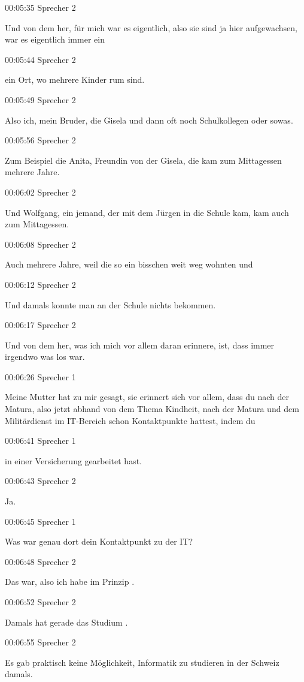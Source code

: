 00:05:35 Sprecher 2

Und von dem her, für mich war es eigentlich, also sie sind ja hier
aufgewachsen, war es eigentlich immer ein

00:05:44 Sprecher 2

ein Ort, wo mehrere Kinder rum sind.

00:05:49 Sprecher 2

Also ich, mein Bruder, die Gisela und dann oft noch Schulkollegen oder
sowas.

00:05:56 Sprecher 2

Zum Beispiel die Anita, Freundin von der Gisela, die kam zum Mittagessen
mehrere Jahre.

00:06:02 Sprecher 2

Und Wolfgang, ein jemand, der mit dem Jürgen in die Schule kam, kam auch
zum Mittagessen.

00:06:08 Sprecher 2

Auch mehrere Jahre, weil die so ein bisschen weit weg wohnten und

00:06:12 Sprecher 2

Und damals konnte man an der Schule nichts bekommen.

00:06:17 Sprecher 2

Und von dem her, was ich mich vor allem daran erinnere, ist, dass immer
irgendwo was los war.

00:06:26 Sprecher 1

Meine Mutter hat zu mir gesagt, sie erinnert sich vor allem, dass du
nach der Matura, also jetzt abhand von dem Thema Kindheit, nach der
Matura und dem Militärdienst im IT-Bereich schon Kontaktpunkte hattest,
indem du

00:06:41 Sprecher 1

in einer Versicherung gearbeitet hast.

00:06:43 Sprecher 2

Ja.

00:06:45 Sprecher 1

Was war genau dort dein Kontaktpunkt zu der IT?

00:06:48 Sprecher 2

Das war, also ich habe im Prinzip .

00:06:52 Sprecher 2

Damals hat gerade das Studium .

00:06:55 Sprecher 2

Es gab praktisch keine Möglichkeit, Informatik zu studieren in der
Schweiz damals.

